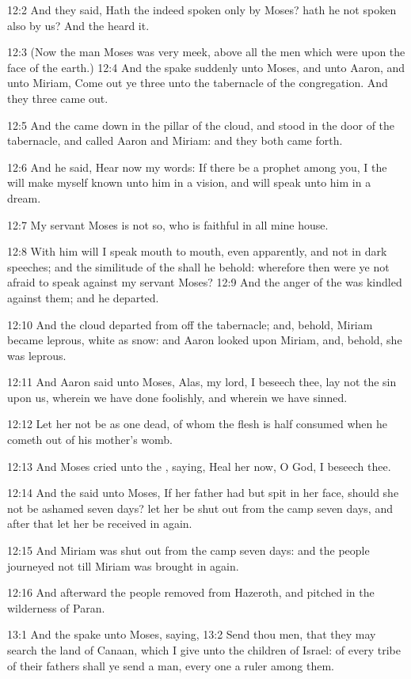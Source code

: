 12:2 And they said, Hath the \LORD indeed spoken only by Moses? hath he
not spoken also by us? And the \LORD heard it.

12:3 (Now the man Moses was very meek, above all the men which were
upon the face of the earth.)  12:4 And the \LORD spake suddenly unto
Moses, and unto Aaron, and unto Miriam, Come out ye three unto the
tabernacle of the congregation. And they three came out.

12:5 And the \LORD came down in the pillar of the cloud, and stood in
the door of the tabernacle, and called Aaron and Miriam: and they both
came forth.

12:6 And he said, Hear now my words: If there be a prophet among you,
I the \LORD will make myself known unto him in a vision, and will speak
unto him in a dream.

12:7 My servant Moses is not so, who is faithful in all mine house.

12:8 With him will I speak mouth to mouth, even apparently, and not in
dark speeches; and the similitude of the \LORD shall he behold:
wherefore then were ye not afraid to speak against my servant Moses?
12:9 And the anger of the \LORD was kindled against them; and he
departed.

12:10 And the cloud departed from off the tabernacle; and, behold,
Miriam became leprous, white as snow: and Aaron looked upon Miriam,
and, behold, she was leprous.

12:11 And Aaron said unto Moses, Alas, my lord, I beseech thee, lay
not the sin upon us, wherein we have done foolishly, and wherein we
have sinned.

12:12 Let her not be as one dead, of whom the flesh is half consumed
when he cometh out of his mother's womb.

12:13 And Moses cried unto the \LORD, saying, Heal her now, O God, I
beseech thee.

12:14 And the \LORD said unto Moses, If her father had but spit in her
face, should she not be ashamed seven days? let her be shut out from
the camp seven days, and after that let her be received in again.

12:15 And Miriam was shut out from the camp seven days: and the people
journeyed not till Miriam was brought in again.

12:16 And afterward the people removed from Hazeroth, and pitched in
the wilderness of Paran.

13:1 And the \LORD spake unto Moses, saying, 13:2 Send thou men, that
they may search the land of Canaan, which I give unto the children of
Israel: of every tribe of their fathers shall ye send a man, every one
a ruler among them.

